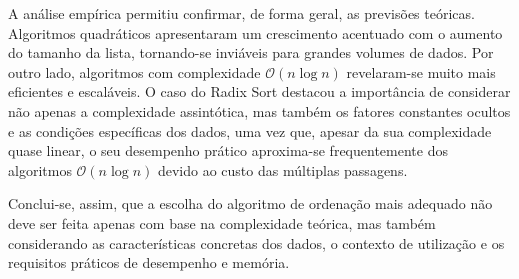 \documentclass[conference]{IEEEtran}
\begin{document}
A análise empírica permitiu confirmar, de forma geral, as previsões teóricas. Algoritmos quadráticos apresentaram um crescimento acentuado com o aumento do tamanho da lista, tornando-se inviáveis para grandes volumes de dados. Por outro lado, algoritmos com complexidade \( \mathcal{O}(n \log n) \) revelaram-se muito mais eficientes e escaláveis. O caso do Radix Sort destacou a importância de considerar não apenas a complexidade assintótica, mas também os fatores constantes ocultos e as condições específicas dos dados, uma vez que, apesar da sua complexidade quase linear, o seu desempenho prático aproxima-se frequentemente dos algoritmos \( \mathcal{O}(n \log n) \) devido ao custo das múltiplas passagens.

Conclui-se, assim, que a escolha do algoritmo de ordenação mais adequado não deve ser feita apenas com base na complexidade teórica, mas também considerando as características concretas dos dados, o contexto de utilização e os requisitos práticos de desempenho e memória.

\nocite{*}


\end{document}
